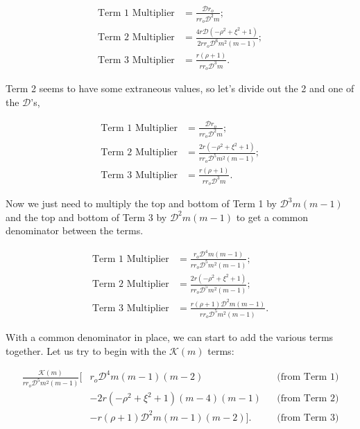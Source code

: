 \begin{align}
    \text{Term 1 Multiplier} &= \frac{\mathcal{D}r_o}{rr_o\mathcal{D}^2m}; \\
    \text{Term 2 Multiplier} &= \frac{4r\mathcal{D}(-\rho^2+\xi^2+1)}{2rr_o\mathcal{D}^6m^2(m-1)}; \\
    \text{Term 3 Multiplier} &= \frac{r(\rho+1)}{rr_o\mathcal{D}^3m}.
\end{align}

\noindent Term 2 seems to have some extraneous values, so let's divide out the 2 and one of the \(\mathcal{D}\)'s,

\begin{align}
    \text{Term 1 Multiplier} &= \frac{\mathcal{D}r_o}{rr_o\mathcal{D}^2m}; \\
    \text{Term 2 Multiplier} &= \frac{2r(-\rho^2+\xi^2+1)}{rr_o\mathcal{D}^5m^2(m-1)}; \\
    \text{Term 3 Multiplier} &= \frac{r(\rho+1)}{rr_o\mathcal{D}^3m}.
\end{align}

\noindent Now we just need to multiply the top and bottom of Term 1 by \(\mathcal{D}^3m(m-1)\) and the top and bottom of Term 3 by \(\mathcal{D}^2m(m-1)\) to get a common denominator between the terms.

\begin{align}
    \label{eqn:vzt1m}
    \text{Term 1 Multiplier} &= \frac{r_o\mathcal{D}^4m(m-1)}{rr_o\mathcal{D}^5m^2(m-1)}; \\
    \label{eqn:vzt2m}
    \text{Term 2 Multiplier} &= \frac{2r(-\rho^2+\xi^2+1)}{rr_o\mathcal{D}^5m^2(m-1)}; \\
    \label{eqn:vzt3m}
    \text{Term 3 Multiplier} &= \frac{r(\rho+1)\mathcal{D}^2m(m-1)}{rr_o\mathcal{D}^5m^2(m-1)}.
\end{align}

With a common denominator in place, we can start to add the various terms together.
%
Let us try to begin with the \(\mathcal{K}(m)\) terms:

\begin{equation}
    \begin{aligned}
        \frac{\mathcal{K}(m)}{rr_o\mathcal{D}^5m^2(m-1)} \bigg[&  r_o\mathcal{D}^4m(m-1)(m-2)  && \text{(from Term 1)} \\
      &- 2r(-\rho^2+\xi^2+1)(m-4)(m-1) && \text{(from Term 2)} \\
      &- r(\rho+1)\mathcal{D}^2m(m-1)(m-2) \bigg]. && \text{(from Term 3)} \\
    \end{aligned}
\end{equation}


